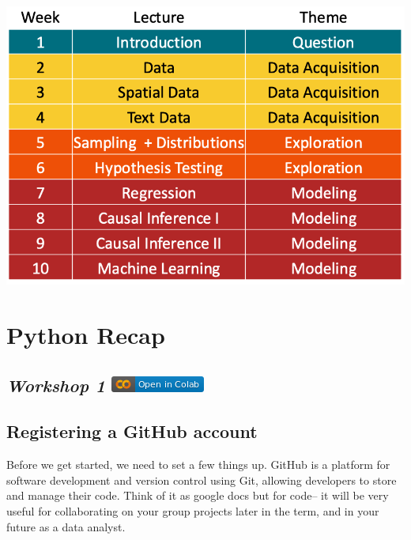 \documentclass[
  letterpaper,
  DIV=11,
  numbers=noendperiod]{scrreprt}
\begin{document}
\includegraphics{outline.png}


\hypertarget{python-recap}{%
\chapter{Python Recap}\label{python-recap}}

\hypertarget{workshop-1-open-in-colab}{%
\section[\emph{Workshop 1} ]{\texorpdfstring{\emph{Workshop 1}
\href{https://colab.research.google.com/github/oballinger/QM2/blob/main/notebooks/W01.\%20Python\%20Recap.ipynb}{\protect\includegraphics{index_files/mediabag/colab-badge.png}}}{Workshop 1 Open In Colab}}\label{workshop-1-open-in-colab}}

\hypertarget{registering-a-github-account}{%
\section{Registering a GitHub
account}\label{registering-a-github-account}}

Before we get started, we need to set a few things up. GitHub is a
platform for software development and version control using Git,
allowing developers to store and manage their code. Think of it as
google docs but for code-- it will be very useful for collaborating on
your group projects later in the term, and in your future as a data
analyst.
\end{document}
